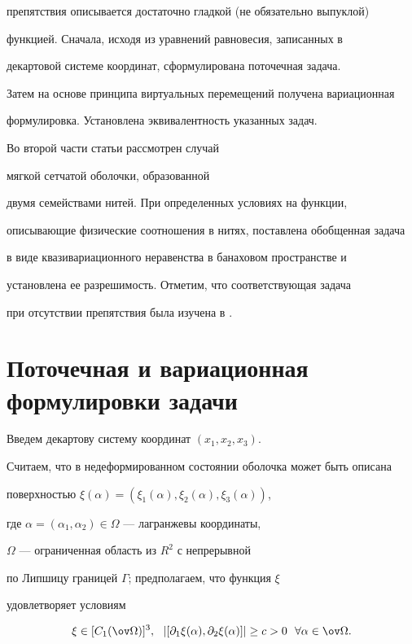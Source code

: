 препятствия описывается достаточно гладкой (не обязательно выпуклой)


функцией. Сначала, исходя из уравнений равновесия, записанных в 


декартовой системе координат, сформулирована поточечная задача. 


Затем на основе принципа виртуальных перемещений получена вариационная 


формулировка. Установлена эквивалентность указанных задач.





Во второй части статьи рассмотрен случай 


мягкой сетчатой оболочки, образованной


двумя семействами нитей. При определенных условиях на функции,


описывающие физические соотношения в нитях, поставлена обобщенная задача


в виде квазивариационного неравенства в банаховом пространстве и 


установлена ее разрешимость. Отметим, что соответствующая задача 


при отсутствии препятствия была изучена в \cite{BZ_92IV}.





\section{Поточечная и вариационная формулировки задачи}





Введем декартову систему координат $(x_1,x_2,x_3)$.


Считаем, что в недеформированном состоянии оболочка может быть описана 


поверхностью $\xi(\alpha)=(\xi_1(\alpha),\xi_2(\alpha),\xi_3(\alpha))$,


где $\alpha=(\alpha_1,\alpha_2) \in \Omega$ --- лагранжевы координаты,


$\Omega$ --- ограниченная область из $R^{2}$ с непрерывной 


по Липшицу границей $\Gamma$; предполагаем, что функция $\xi$


удовлетворяет условиям


\begin{equation}


\xi \in [C_1(\ov \Omega) ]^3,


\ \ | [\partial_1 \xi (\alpha),\partial_2 \xi (\alpha) ] |


\geq c > 0 \ \  \forall\alpha\in \ov \Omega.


\label{2}


\end{equation}





